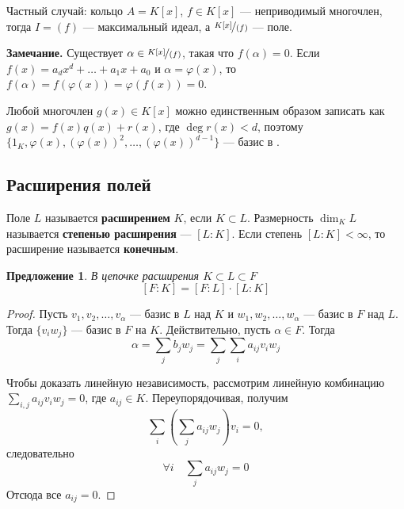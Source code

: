 \documentclass[a4paper]{article}
\let\temp\phi
\let\phi\varphi
\let\varphi\temp
\numberwithin{theorem}{section}
\numberwithin{lemma}{section}
\newtheorem{proposition}{Предложение}
\numberwithin{proposition}{section}
\numberwithin{corollary}{section}
\begin{document}
\begin{minipage}{0.7\linewidth}
Частный случай: кольцо $A = K[x]$, $f \in K[x]$ --- неприводимый многочлен, тогда $I = (f)$ --- максимальный идеал,
а $\nicefrac{K[x]}{(f)}$ --- поле.
\end{minipage}
\begin{minipage}{0.15\linewidth}
\end{minipage}

\textbf{Замечание.}
Существует $\alpha \in \nicefrac{K[x]}{(f)}$, такая что $f(\alpha) = 0$. Если $f(x) = a_d x^d + \ldots + a_1 x + a_0 $ и $\alpha = \phi(x)$,
то $f(\alpha) = f(\phi(x)) = \phi(f(x)) = 0$.

Любой многочлен $g(x) \in K[x]$ можно единственным образом записать как $g(x) = f(x)q(x) + r(x)$, где $\deg r(x) < d$, поэтому
$\{1_K, \phi(x), (\phi(x))^2, \ldots, (\phi(x))^{d-1}\}$ --- базис в
.

\subsection*{Расширения полей}
Поле $L$ называется \textbf{расширением} $K$, если $K \subset L$.
Размерность $\dim_K L$ называется \textbf{степенью расширения} --- $[L : K]$.
Если степень $[L : K] < \infty$, то расширение называется \textbf{конечным}.

\begin{proposition} В цепочке расширения $K \subset L \subset F$
\[[F:K] = [F:L] \cdot [L : K]\]
\end{proposition}
\begin{proof}
Пусть $v_1, v_2, \ldots, v_\alpha$ --- базис в $L$ над $K$ и
$w_1, w_2, \ldots, w_\alpha$ --- базис в $F$ над $L$.
Тогда $\{v_i w_j\}$ --- базис в $F$ на $K$.
Действительно, пусть $\alpha \in F$. Тогда
\[\alpha = \sum_j b_j w_j = \sum_j \sum_i a_{ij}v_i w_j \]

Чтобы доказать линейную независимость, рассмотрим
линейную комбинацию $\sum_{i,j} a_{ij}v_i w_j = 0$, где $a_{ij} \in K$.
Переупорядочивая, получим \[\sum_i\left(\sum_j a_{ij} w_j\right)v_i = 0,\]
следовательно \[\forall i \quad \sum_j a_{ij} w_j = 0\]
Отсюда все $a_{ij} = 0$.
\end{proof}
\end{document}
